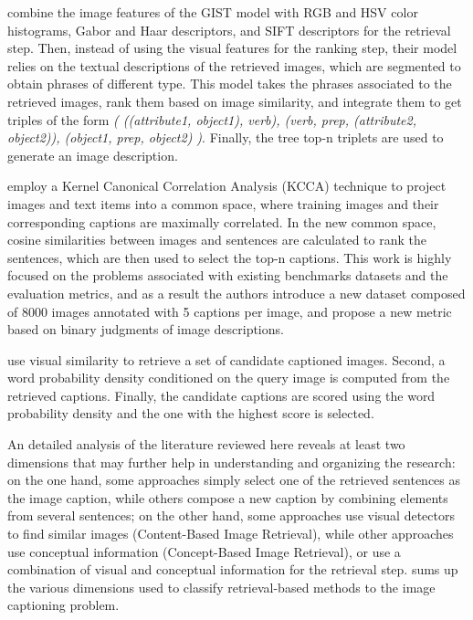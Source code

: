 \citet{Gupta2012} combine the image features of the GIST model with RGB and HSV color histograms, Gabor and Haar descriptors, and SIFT \citep{Lowe2004} descriptors for the retrieval step. Then, instead of using the visual features for the ranking step, their model relies on the textual descriptions of the retrieved images, which are segmented to obtain phrases of different type. This model takes the phrases associated to the retrieved images, rank them based on image similarity, and integrate them to get triples of the form \textit{( ((attribute1, object1), verb), (verb, prep, (attribute2, object2)), (object1, prep, object2) )}. Finally, the tree top-n triplets are used to generate an image description.

\citet{Hodosh2013b} employ a Kernel Canonical Correlation Analysis (KCCA) \citep{Bach2003} technique to project images and text items into a common space, where training images and their corresponding captions are maximally correlated. In the new common space, cosine similarities between images and sentences are calculated to rank the sentences, which are then used to select the top-n captions. This work is highly focused on the problems associated with existing benchmarks datasets and the evaluation metrics, and as a result the authors introduce a new dataset composed of 8000 images annotated with 5 captions per image, and propose a new metric based on binary judgments of image descriptions.

\citet{Mason2015} use visual similarity to retrieve a set of candidate captioned images. Second, a word probability density conditioned on the query image is computed from the retrieved captions. Finally, the candidate captions are scored using the word probability density and the one with the highest score is selected. 

An detailed analysis of the literature reviewed here reveals at least two dimensions that may further help in understanding and organizing the research: on the one hand, some approaches simply select one of the retrieved sentences as the image caption, while others compose a new caption by combining elements from several sentences; on the other hand, some approaches use visual detectors to find similar images (Content-Based Image Retrieval), while other approaches use conceptual information (Concept-Based Image Retrieval), or use a combination of visual and conceptual information for the retrieval step.  sums up the various dimensions used to classify retrieval-based methods to the image captioning problem.

